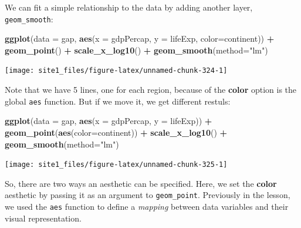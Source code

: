 \documentclass[]{book}
\newenvironment{Shaded}{\begin{snugshade}}{\end{snugshade}}
\newcommand{\KeywordTok}[1]{\textcolor[rgb]{0.13,0.29,0.53}{\textbf{#1}}}
\newcommand{\DataTypeTok}[1]{\textcolor[rgb]{0.13,0.29,0.53}{#1}}
\newcommand{\StringTok}[1]{\textcolor[rgb]{0.31,0.60,0.02}{#1}}
\newcommand{\OperatorTok}[1]{\textcolor[rgb]{0.81,0.36,0.00}{\textbf{#1}}}
\newcommand{\NormalTok}[1]{#1}
\begin{document}
We can fit a simple relationship to the data by adding another layer,
\texttt{geom\_smooth}:

\begin{Shaded}
\begin{Highlighting}[]
\KeywordTok{ggplot}\NormalTok{(}\DataTypeTok{data =}\NormalTok{ gap, }\KeywordTok{aes}\NormalTok{(}\DataTypeTok{x =}\NormalTok{ gdpPercap, }\DataTypeTok{y =}\NormalTok{ lifeExp, }\DataTypeTok{color=}\NormalTok{continent)) }\OperatorTok{+}\StringTok{ }
\StringTok{  }\KeywordTok{geom_point}\NormalTok{() }\OperatorTok{+}\StringTok{ }
\StringTok{  }\KeywordTok{scale_x_log10}\NormalTok{() }\OperatorTok{+}\StringTok{ }
\StringTok{  }\KeywordTok{geom_smooth}\NormalTok{(}\DataTypeTok{method=}\StringTok{"lm"}\NormalTok{)}
\end{Highlighting}
\end{Shaded}

\begin{center}\texttt{[image: site1\_files/figure-latex/unnamed-chunk-324-1]} \end{center}

Note that we have 5 lines, one for each region, because of the
\textbf{color} option is the global \texttt{aes} function. But if we
move it, we get different restuls:

\begin{Shaded}
\begin{Highlighting}[]
\KeywordTok{ggplot}\NormalTok{(}\DataTypeTok{data =}\NormalTok{ gap, }\KeywordTok{aes}\NormalTok{(}\DataTypeTok{x =}\NormalTok{ gdpPercap, }\DataTypeTok{y =}\NormalTok{ lifeExp)) }\OperatorTok{+}\StringTok{ }
\StringTok{  }\KeywordTok{geom_point}\NormalTok{(}\KeywordTok{aes}\NormalTok{(}\DataTypeTok{color=}\NormalTok{continent)) }\OperatorTok{+}\StringTok{ }
\StringTok{  }\KeywordTok{scale_x_log10}\NormalTok{() }\OperatorTok{+}\StringTok{ }
\StringTok{  }\KeywordTok{geom_smooth}\NormalTok{(}\DataTypeTok{method=}\StringTok{"lm"}\NormalTok{)}
\end{Highlighting}
\end{Shaded}

\begin{center}\texttt{[image: site1\_files/figure-latex/unnamed-chunk-325-1]} \end{center}

So, there are two ways an aesthetic can be specified. Here, we set the
\textbf{color} aesthetic by passing it as an argument to
\texttt{geom\_point}. Previously in the lesson, we used the \texttt{aes}
function to define a \emph{mapping} between data variables and their
visual representation.
\end{document}
